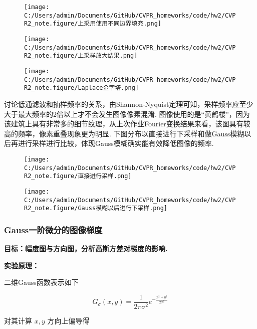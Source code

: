 \documentclass[
]{article}
\begin{document}
\begin{figure}
\centering
\texttt{[image: C:/Users/admin/Documents/GitHub/CVPR\_homeworks/code/hw2/CVPR2\_note.figure/上采用使用不同边界填充.png]}
\caption{}
\end{figure}

\begin{figure}
\centering
\texttt{[image: C:/Users/admin/Documents/GitHub/CVPR\_homeworks/code/hw2/CVPR2\_note.figure/上采样放大结果.png]}
\caption{}
\end{figure}

\begin{figure}
\centering
\texttt{[image: C:/Users/admin/Documents/GitHub/CVPR\_homeworks/code/hw2/CVPR2\_note.figure/Laplace金字塔.png]}
\caption{}
\end{figure}

讨论低通滤波和抽样频率的关系，由Shannon-Nyquist定理可知，采样频率应至少大于最大频率的2倍以上才不会发生图像像素混淆.
图像使用的是``黄鹤楼''，因为该建筑上具有非常多的细节纹理，从上次作业Fourier变换结果来看，该图具有较高的频率，像素重叠现象更为明显.
下图分布以直接进行下采样和做Gauss模糊以后再进行采样进行比较，体现Gauss模糊确实能有效降低图像的频率.

\begin{figure}
\centering
\texttt{[image: C:/Users/admin/Documents/GitHub/CVPR\_homeworks/code/hw2/CVPR2\_note.figure/直接进行采样.png]}
\caption{}
\end{figure}

\begin{figure}
\centering
\texttt{[image: C:/Users/admin/Documents/GitHub/CVPR\_homeworks/code/hw2/CVPR2\_note.figure/Gauss模糊以后进行下采样.png]}
\caption{}
\end{figure}

\hypertarget{gaussux4e00ux9636ux5faeux5206ux7684ux56feux50cfux68afux5ea6}{%
\subsubsection{Gauss一阶微分的图像梯度}\label{gaussux4e00ux9636ux5faeux5206ux7684ux56feux50cfux68afux5ea6}}

\textbf{目标：幅度图与方向图，分析高斯方差对梯度的影响.}

\textbf{实验原理：}

二维Gauss函数表示如下

\[G_{\sigma}(x, y)=\frac{1}{2\pi \sigma^2}e^{-\frac{x^2+y^2}{2\sigma^2}}\]

对其计算 \(x, y\) 方向上偏导得
\end{document}
